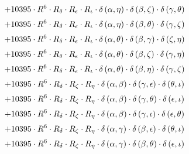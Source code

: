\begin{subequations}
\begin{gather}
 \\[0.2em] \notag 		 + 10395 \cdot R^{6} \cdot R_{\delta{}} \cdot R_{\epsilon{}} \cdot R_{\iota{}} \cdot \delta{}\left(\alpha{}, \eta{}\right) \cdot \delta{}\left(\beta{}, \zeta{}\right) \cdot \delta{}\left(\gamma{}, \theta{}\right) 
 \\[0.2em] \notag 		 + 10395 \cdot R^{6} \cdot R_{\delta{}} \cdot R_{\epsilon{}} \cdot R_{\iota{}} \cdot \delta{}\left(\alpha{}, \eta{}\right) \cdot \delta{}\left(\beta{}, \theta{}\right) \cdot \delta{}\left(\gamma{}, \zeta{}\right) 
 \\[0.2em] \notag 		 + 10395 \cdot R^{6} \cdot R_{\delta{}} \cdot R_{\epsilon{}} \cdot R_{\iota{}} \cdot \delta{}\left(\alpha{}, \theta{}\right) \cdot \delta{}\left(\beta{}, \gamma{}\right) \cdot \delta{}\left(\zeta{}, \eta{}\right) 
 \\[0.2em] \notag 		 + 10395 \cdot R^{6} \cdot R_{\delta{}} \cdot R_{\epsilon{}} \cdot R_{\iota{}} \cdot \delta{}\left(\alpha{}, \theta{}\right) \cdot \delta{}\left(\beta{}, \zeta{}\right) \cdot \delta{}\left(\gamma{}, \eta{}\right) 
 \\[0.2em] \notag 		 + 10395 \cdot R^{6} \cdot R_{\delta{}} \cdot R_{\epsilon{}} \cdot R_{\iota{}} \cdot \delta{}\left(\alpha{}, \theta{}\right) \cdot \delta{}\left(\beta{}, \eta{}\right) \cdot \delta{}\left(\gamma{}, \zeta{}\right) 
 \\[0.2em] \notag 		 + 10395 \cdot R^{6} \cdot R_{\delta{}} \cdot R_{\zeta{}} \cdot R_{\eta{}} \cdot \delta{}\left(\alpha{}, \beta{}\right) \cdot \delta{}\left(\gamma{}, \epsilon{}\right) \cdot \delta{}\left(\theta{}, \iota{}\right) 
 \\[0.2em] \notag 		 + 10395 \cdot R^{6} \cdot R_{\delta{}} \cdot R_{\zeta{}} \cdot R_{\eta{}} \cdot \delta{}\left(\alpha{}, \beta{}\right) \cdot \delta{}\left(\gamma{}, \theta{}\right) \cdot \delta{}\left(\epsilon{}, \iota{}\right) 
 \\[0.2em] \notag 		 + 10395 \cdot R^{6} \cdot R_{\delta{}} \cdot R_{\zeta{}} \cdot R_{\eta{}} \cdot \delta{}\left(\alpha{}, \beta{}\right) \cdot \delta{}\left(\gamma{}, \iota{}\right) \cdot \delta{}\left(\epsilon{}, \theta{}\right) 
 \\[0.2em] \notag 		 + 10395 \cdot R^{6} \cdot R_{\delta{}} \cdot R_{\zeta{}} \cdot R_{\eta{}} \cdot \delta{}\left(\alpha{}, \gamma{}\right) \cdot \delta{}\left(\beta{}, \epsilon{}\right) \cdot \delta{}\left(\theta{}, \iota{}\right) 
 \\[0.2em] \notag 		 + 10395 \cdot R^{6} \cdot R_{\delta{}} \cdot R_{\zeta{}} \cdot R_{\eta{}} \cdot \delta{}\left(\alpha{}, \gamma{}\right) \cdot \delta{}\left(\beta{}, \theta{}\right) \cdot \delta{}\left(\epsilon{}, \iota{}\right) 

\end{gather}
\end{subequations}
